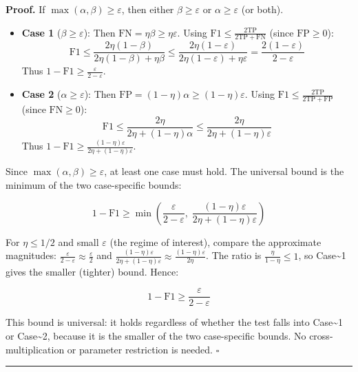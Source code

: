 \documentclass[
  12pt,
]{article}
\begin{document}
\textbf{Proof.} If \(\max(\alpha, \beta) \geq \varepsilon\), then either
\(\beta \geq \varepsilon\) or \(\alpha \geq \varepsilon\) (or both).

\begin{itemize}
\item
  \textbf{Case 1} (\(\beta \geq \varepsilon\)): Then
  \(\text{FN} = \eta\beta \geq \eta\varepsilon\). Using
  \(\text{F1} \leq \frac{2\text{TP}}{2\text{TP}+\text{FN}}\) (since
  \(\text{FP} \geq 0\)):
  \[\text{F1} \leq \frac{2\eta(1-\beta)}{2\eta(1-\beta) + \eta\beta}
        \leq \frac{2\eta(1-\varepsilon)}{2\eta(1-\varepsilon) + \eta\varepsilon}
        = \frac{2(1-\varepsilon)}{2-\varepsilon}\] Thus
  \(1 - \text{F1} \geq \frac{\varepsilon}{2-\varepsilon}\).
\item
  \textbf{Case 2} (\(\alpha \geq \varepsilon\)): Then
  \(\text{FP} = (1-\eta)\alpha \geq (1-\eta)\varepsilon\). Using
  \(\text{F1} \leq \frac{2\text{TP}}{2\text{TP} + \text{FP}}\) (since
  \(\text{FN} \geq 0\)):
  \[\text{F1} \leq \frac{2\eta}{2\eta + (1-\eta)\alpha}
        \leq \frac{2\eta}{2\eta + (1-\eta)\varepsilon}\] Thus
  \(1 - \text{F1} \geq \frac{(1-\eta)\varepsilon}{2\eta + (1-\eta)\varepsilon}\).
\end{itemize}

Since \(\max(\alpha, \beta) \geq \varepsilon\), at least one case must
hold. The universal bound is the minimum of the two case-specific
bounds:

\[1 - \text{F1} \geq \min\!\left(\frac{\varepsilon}{2-\varepsilon},\;
\frac{(1-\eta)\varepsilon}{2\eta + (1-\eta)\varepsilon}\right)\]

For \(\eta \leq 1/2\) and small \(\varepsilon\) (the regime of
interest), compare the approximate magnitudes:
\(\frac{\varepsilon}{2-\varepsilon} \approx \frac{\varepsilon}{2}\) and
\(\frac{(1-\eta)\varepsilon}{2\eta + (1-\eta)\varepsilon} \approx
\frac{(1-\eta)\varepsilon}{2\eta}\). The ratio is
\(\frac{\eta}{1-\eta} \leq 1\), so Case\textasciitilde1 gives the
smaller (tighter) bound. Hence:

\[1 - \text{F1} \geq \frac{\varepsilon}{2-\varepsilon}\]

This bound is universal: it holds regardless of whether the test falls
into Case\textasciitilde1 or Case\textasciitilde2, because it is the
smaller of the two case-specific bounds. No cross-multiplication or
parameter restriction is needed. \(\square\)

\begin{center}\rule{0.5\linewidth}{0.5pt}\end{center}
\end{document}
